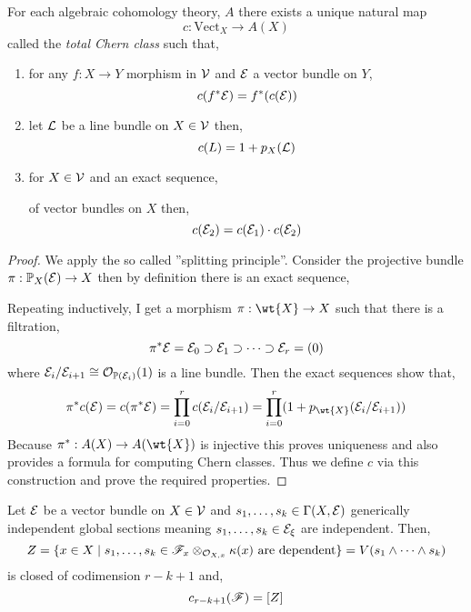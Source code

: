 \documentclass[12pt]{article}
\begin{document}
\begin{thm}
For each algebraic cohomology theory, $A$ there exists a unique natural map \[ c : \mathrm{Vect}_X \to A(X) \]
called the \textit{total Chern class} such that,
\begin{enumerate}
\item for any $f : X \to Y$ morphism in $\mathcal{V}$ and $\mathcal{E}$ a vector bundle on $Y$,
\[ c(f^* \mathcal{E}) = f^*(c(\mathcal{E})) \]
\item let $\mathcal{L}$ be a line bundle on $X \in \mathcal{V}$ then,
\[ c(L) = 1 + p_X(\mathcal{L}) \]
\item for $X \in \mathcal{V}$ and an exact sequence,
\begin{center}
\end{center}
of vector bundles on $X$ then,
\[ c(\mathcal{E}_2) = c(\mathcal{E}_1) \cdot c(\mathcal{E}_2) \]
\end{enumerate}
\end{thm}

\begin{proof}
We apply the so called ''splitting principle''. Consider the projective bundle $\pi : \mathbb{P}_X(\mathcal{E}) \to X$ then by definition there is an exact sequence,
\begin{center}
\end{center}
Repeating inductively, I get a morphism $\pi : \wt{X} \to X$ such that there is a filtration,
\[ \pi^* \mathcal{E} = \mathcal{E}_0 \supset \mathcal{E}_1 \supset \cdots \supset \mathcal{E}_r = (0) \]
where $\mathcal{E}_i / \mathcal{E}_{i+1} \cong \mathcal{O}_{\mathbb{P}(\mathcal{E}_i)}(1)$ is a line bundle. Then the exact sequences show that,
\[ \pi^* c(\E) = c(\pi^* \E) = \prod_{i = 0}^r c(\E_i / \E_{i+1}) = \prod_{i = 0}^r (1 + p_{\wt{X}}(\E_i/\E_{i+1})) \]
Because $\pi^* : A(X) \to A(\wt{X})$ is injective this proves uniqueness and also provides a formula for computing Chern classes. Thus we define $c$ via this construction and prove the required properties.
\end{proof}


\begin{prop}
Let $\mathcal{E}$ be a vector bundle on $X \in \mathcal{V}$ and $s_1, \dots, s_k \in \Gamma(X, \mathcal{E})$ generically independent global sections meaning $s_1, \dots, s_k \in \mathcal{E}_\xi$ are independent. Then,
\[ Z = \{ x \in X \mid s_1, \dots, s_k \in \mathscr{F}_x \otimes_{\mathcal{O}_{X, x}} \kappa(x) \text{ are dependent} \} = V(s_1 \wedge \cdots \wedge s_k) \]
is closed of codimension $r - k + 1$ and,
\[ c_{r - k + 1}(\mathscr{F}) = [Z] \]
\end{prop}
\end{document}
